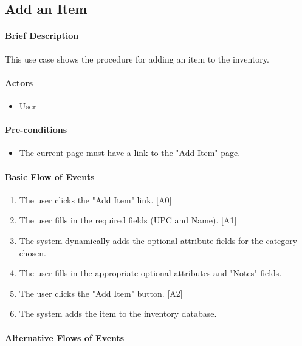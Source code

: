 \documentclass{article}
\begin{document}
\subsection{Add an Item}

\paragraph{Brief Description}
This use case shows the procedure for adding an item to the inventory.

\paragraph{Actors}
\begin{itemize}
\item User
\end{itemize}

\paragraph{Pre-conditions}
\begin{itemize}
\item The current page must have a link to the "Add Item" page.
\end{itemize}

\paragraph{Basic Flow of Events}
\begin{enumerate}
\item The user clicks the "Add Item" link. [A0]
\item The user fills in the required fields (UPC and Name). [A1]
\item The system dynamically adds the optional attribute fields for the category chosen.
\item The user fills in the appropriate optional attributes and "Notes" fields.
\item The user clicks the "Add Item" button. [A2]
\item The system adds the item to the inventory database.
\end{enumerate}

\paragraph{Alternative Flows of Events}
\end{document}
